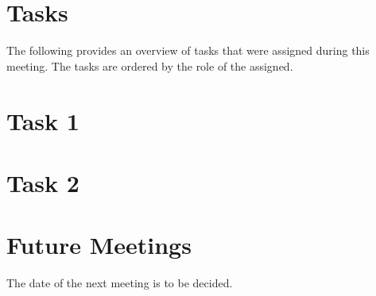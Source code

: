 \documentclass[12pt, a4paper]{article}
\begin{document}
\section*{Tasks}
The following provides an overview of tasks that were assigned during this meeting. The tasks are ordered by the role of the assigned.
\setcounter{section}{0}
\section{Task 1}
\section{Task 2}
\section*{Future Meetings}
The date of the next meeting is to be decided.
\end{document}
